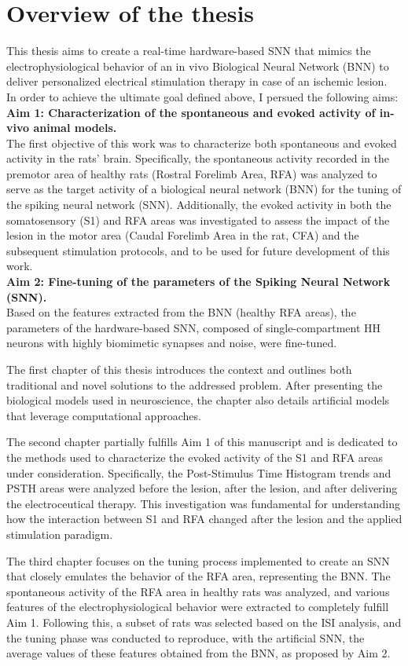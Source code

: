\chapter*{Overview of the thesis}

This thesis aims to create a real-time hardware-based SNN that mimics the electrophysiological behavior of an in vivo Biological Neural Network (BNN) to deliver personalized electrical stimulation therapy in case of an ischemic lesion.
\bigskip\\
In order to achieve the ultimate goal defined above, I persued the following aims:\\
\textbf{Aim 1: Characterization of the spontaneous and evoked activity of in-vivo animal models.}\\
The first objective of this work was to characterize both spontaneous and evoked activity in the rats' brain. Specifically, the spontaneous activity recorded in the premotor area of healthy rats (Rostral Forelimb Area, RFA) was analyzed to serve as the target activity of a biological neural network (BNN) for the tuning of the spiking neural network (SNN). Additionally, the evoked activity in both the somatosensory (S1) and RFA areas was investigated to assess the impact of the lesion in the motor area (Caudal Forelimb Area in the rat, CFA) and the subsequent stimulation protocols, and to be used for future development of this work.\\
\textbf{Aim 2: Fine-tuning of the parameters of the Spiking Neural Network (SNN).}\\
Based on the features extracted from the BNN (healthy RFA areas), the parameters of the hardware-based SNN, composed of single-compartment HH neurons with highly biomimetic synapses and noise, were fine-tuned.
\bigskip

The first chapter of this thesis introduces the context and outlines both traditional and novel solutions to the addressed problem. After presenting the biological models used in neuroscience, the chapter also details artificial models that leverage computational approaches.
\bigskip

The second chapter partially fulfills Aim 1 of this manuscript and is dedicated to the methods used to characterize the evoked activity of the S1 and RFA areas under consideration. Specifically, the Post-Stimulus Time Histogram trends and PSTH areas were analyzed before the lesion, after the lesion, and after delivering the electroceutical therapy. This investigation was fundamental for understanding how the interaction between S1 and RFA changed after the lesion and the applied stimulation paradigm.
\bigskip

The third chapter focuses on the tuning process implemented to create an SNN that closely emulates the behavior of the RFA area, representing the BNN. The spontaneous activity of the RFA area in healthy rats was analyzed, and various features of the electrophysiological behavior were extracted to completely fulfill Aim 1. Following this, a subset of rats was selected based on the ISI analysis, and the tuning phase was conducted to reproduce, with the artificial SNN, the average values of these features obtained from the BNN, as proposed by Aim 2.
